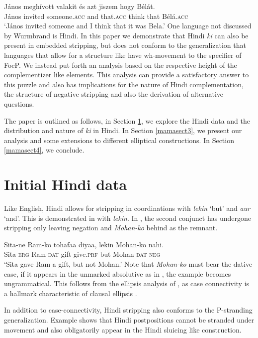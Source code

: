 \documentclass[output=paper]{langscibook}
\begin{document}
\ea \label{maex4}
    \gll J\'{a}nos megh\'{i}vott valakit \'{e}s azt jiszem hogy B\'{e}l\'{a}t.\\
    J\'{a}nos invited someone.\textsc{acc} and that.\textsc{acc} think that B\'{e}l\'{a}.\textsc{acc}\\
    \glt `J\'{a}nos invited someone and I think that it was Bela.'
\z
One language not discussed by Wurmbrand is Hindi. In this paper we demonstrate that Hindi \emph{ki} can also be present in embedded stripping, but does not conform to the generalization that languages that allow for a structure like  have wh-movement to the specifier of FocP. We instead put forth an analysis based on the respective height of the complementizer like elements. This analysis can provide a satisfactory answer to this puzzle and also has implications for the nature of Hindi complementation, the structure of negative stripping and also the derivation of alternative questions.

The paper is outlined as follows, in Section \ref{mamasect2}, we explore the Hindi data and the distribution and nature of \emph{ki} in Hindi. In Section \ref{mamasect3}, we present our analysis and some extensions to different elliptical constructions. In Section \ref{mamasect4}, we conclude.

\section{Initial Hindi data}\label{mamasect2}
Like English, Hindi allows for stripping in coordinations with \emph{lekin} `but' and \emph{aur} `and'. This is demonstrated in  with \emph{lekin}. In , the second conjunct has undergone stripping only leaving negation and \emph{Mohan-ko} behind as the remnant.

\ea \label{maex5}
    \gll Sita-ne Ram-ko tohafaa diyaa, lekin Mohan-ko nahi.\\
    Sita-\textsc{erg} Ram-\textsc{dat} gift give.\textsc{prf} but Mohan-\textsc{dat} \textsc{neg}\\
    \glt `Sita gave Ram a gift, but not Mohan.'
\z 
Note that \emph{Mohan-ko} must bear the dative case, if it appears in the unmarked absolutive as in , the example becomes ungrammatical. This follows from the ellipsis analysis of , as case connectivity is a hallmark characteristic of clausal ellipsis \citep{merchant01}.

\z 
In addition to case-connectivity, Hindi stripping also conforms to the P-stranding generalization. Example  shows that Hindi postpositions cannot be stranded under movement and also obligatorily appear in the Hindi sluicing like construction.
\end{document}
